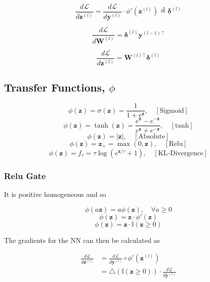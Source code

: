 \documentclass[10pt]{article}
\theoremstyle{definition}
\begin{document}
\begin{equation*}
\frac{d\mathcal{L}}{d\mathbf{z}^{(l)}} = \frac{d\mathcal{L}}{d\mathbf{y}^{(l)}} \cdot \phi'(\mathbf{z}^{(l)}) \overset{\Delta}{=} \pmb{\delta}^{(l)}
\end{equation*}

\begin{equation*}
\frac{d\mathcal{L}}{d\mathbf{W}^{(l)}} = \pmb{\delta}^{(l)}\mathbf{y}^{(l-1)\top}
\end{equation*}

\begin{equation*}
\frac{d\mathcal{L}}{d\mathbf{z}^{(l)}} = \mathbf{W}^{(l)\top} \pmb{\delta}^{(l)}
\end{equation*}

\subsection*{Transfer Functions, $\phi$}

$$
\phi(\mathbf{z}) = \sigma(\mathbf{z}) = \frac{1}{1 + e^{\mathbf{z}}}, \quad [\text{Sigmoid}]
$$
$$
\phi(\mathbf{z}) = \tanh(\mathbf{z}) = \frac{e^{\mathbf{z}} - e^{-\mathbf{z}}}{e^{\mathbf{z}} + e^{-\mathbf{z}}}, \quad [\text{tanh}]
$$
$$
\phi(\mathbf{z}) = \lvert\mathbf{z}\rvert, \quad [\text{Absolute}]
$$
$$
\phi(\mathbf{z}) = \mathbf{z}_{+} = \max(0,\mathbf{z}), \quad [\text{Relu}]
$$
$$
\phi(\mathbf{z}) = f_{\tau} = \tau\log(e^{\mathbf{z}/\tau} + 1), \quad [\text{KL-Divergence}]
$$

\subsubsection*{Relu Gate}

It is positive homogeneous and so

$$
\phi(a\mathbf{z}) = a\phi(\mathbf{z}), \quad \forall a \geq 0
$$
$$
\phi(\mathbf{z}) = \mathbf{z}\cdot\phi'(\mathbf{z})
$$
$$
\phi(\mathbf{z}) = \mathbf{z}\cdot\mathbb{I}(\mathbf{z}\geq0)
$$

\noindent
The gradients for the NN can then be calculated as

\begin{equation*}
\begin{aligned}
\frac{d\mathcal{L}}{d\mathbf{z}^{(l)}} & = \frac{d\mathcal{L}}{d\mathbf{y}^{(l)}}\circ\phi'(\mathbf{z}^{(l)}) \\
& = \triangle(\mathbb{I}(\mathbf{z}\geq0))\cdot\frac{d\mathcal{L}}{d\mathbf{y}^{(l)}}
\end{aligned}
\end{equation*}
\end{document}
